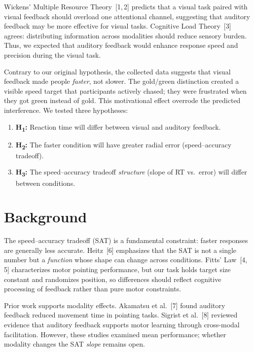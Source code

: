 \documentclass[12pt,letterpaper]{article}
\begin{document}
Wickens' Multiple Resource Theory~[1,\,2] predicts that a visual task paired with visual feedback should overload one attentional channel, suggesting that auditory feedback may be more effective for visual tasks. Cognitive Load Theory~[3] agrees: distributing information across modalities should reduce sensory burden. Thus, we expected that auditory feedback would enhance response speed and precision during the visual task.

Contrary to our original hypothesis, the collected data suggests that visual feedback made people \emph{faster}, not slower. The gold/green distinction created a visible speed target that participants actively chased; they were frustrated when they got green instead of gold. This motivational effect overrode the predicted interference. We tested three hypotheses:

\begin{enumerate}
  \item \textbf{H\textsubscript{1}:} Reaction time will differ between visual and auditory feedback.
  \item \textbf{H\textsubscript{2}:} The faster condition will have greater radial error (speed--accuracy tradeoff).
  \item \textbf{H\textsubscript{3}:} The speed--accuracy tradeoff \emph{structure} (slope of RT vs.\ error) will differ between conditions.
\end{enumerate}


\section{Background}

The speed--accuracy tradeoff (SAT) is a fundamental constraint: faster responses are generally less accurate. Heitz~[6] emphasizes that the SAT is not a single number but a \emph{function} whose shape can change across conditions. Fitts' Law~[4,\,5] characterizes motor pointing performance, but our task holds target size constant and randomizes position, so differences should reflect cognitive processing of feedback rather than pure motor constraints.

Prior work supports modality effects. Akamatsu et al.~[7] found auditory feedback reduced movement time in pointing tasks. Sigrist et al.~[8] reviewed evidence that auditory feedback supports motor learning through cross-modal facilitation. However, these studies examined mean performance; whether modality changes the SAT \emph{slope} remains open.
\end{document}
